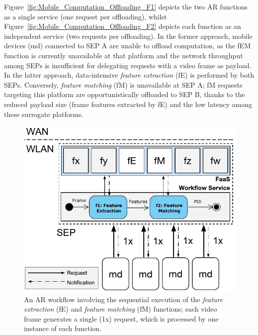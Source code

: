 \documentclass[letterpaper, 10 pt, conference]{ieeeconf}  %
\begin{document}

Figure~\ref{fig:Mobile_Computation_Offloading_F1} depicts the two AR functions as a single service (one request per offloading), whilst Figure~\ref{fig:Mobile_Computation_Offloading_F2} depicts each function as an independent service (two requests per offloading). 
In the former approach, mobile devices (md) connected to SEP A are unable to offload computation, as the fEM function is currently unavailable at that platform and the network throughput among SEPs is insufficient for delegating requests with a video frame as payload. 
In the latter approach, data-intensive \textit{feature extraction} (fE) is performed by both SEPs. Conversely, \textit{feature matching} (fM) is unavailable at SEP A; fM requests targeting this platform are opportunistically offloaded to SEP B,
thanks to the reduced payload size (frame features extracted by fE) and the low latency among these surrogate platforms. 


\begin{figure}[tbp]
	\centering
	\includegraphics[width=\linewidth]{Figs/Mobile_Computation_Offloading_Workflow.pdf}
	\caption{An AR workflow involving the sequential execution of the \textit{feature extraction} (fE) and \textit{feature matching} (fM) functions; each video frame generates a single (1x) request, which is processed by one instance of each function.} 
	\label{fig:Mobile_Computation_Offloading_Workflow}
\end{figure}
\end{document}
